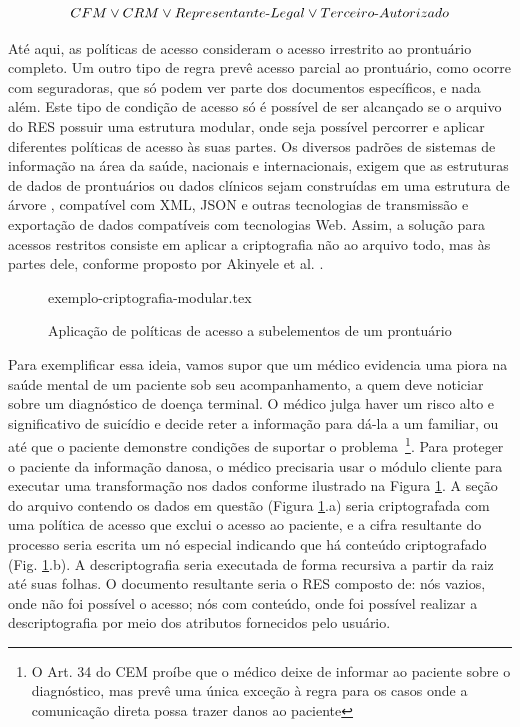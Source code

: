\documentclass[a4paper,11pt]{article}
\begin{document}
\[ CFM \vee CRM \vee Representante\textnormal{-}Legal \vee Terceiro\textnormal{-}Autorizado \]

Até aqui, as políticas de acesso consideram o acesso irrestrito ao prontuário completo. Um outro tipo de regra prevê acesso parcial ao prontuário, como ocorre com seguradoras, que só podem ver parte dos documentos específicos, e nada além.
Este tipo de condição de acesso só é possível de ser alcançado se o arquivo do RES possuir uma estrutura modular, onde seja possível percorrer e aplicar diferentes políticas de acesso às suas partes.
Os diversos padrões de sistemas de informação na área da saúde, nacionais e internacionais, exigem que as estruturas de dados de prontuários ou dados clínicos sejam construídas em uma estrutura de árvore \cite{Munoz2011, Dolin2000, SBIS2016, openEHRFoundation2020}, compatível com XML, JSON e outras tecnologias de transmissão e exportação de dados compatíveis com tecnologias Web.
Assim, a solução para acessos restritos consiste em aplicar a criptografia não ao arquivo todo, mas às partes dele, conforme proposto por Akinyele et al. \cite{Akinyele2010}.

\begin{figure}[h]
  \centering
  {exemplo-criptografia-modular.tex}
  \caption{Aplicação de políticas de acesso a subelementos de um prontuário}
  \label{fig:exemplo-criptografia-modular}
\end{figure}

Para exemplificar essa ideia, vamos supor que um médico evidencia uma piora na saúde mental de um paciente sob seu acompanhamento, a quem deve noticiar sobre um diagnóstico de doença terminal.
O médico julga haver um risco alto e significativo de suicídio e decide reter a informação para dá-la a um familiar, ou até que o paciente demonstre condições de suportar o problema~\footnote{O Art. 34 do CEM proíbe que o médico deixe de informar ao paciente sobre o diagnóstico, mas prevê uma única exceção à regra para os casos onde a comunicação direta possa trazer danos ao paciente}.
Para proteger o paciente da informação danosa, o médico precisaria usar o módulo cliente para executar uma transformação nos dados conforme ilustrado na Figura \ref{fig:exemplo-criptografia-modular}.
A seção do arquivo contendo os dados em questão (Figura \ref{fig:exemplo-criptografia-modular}.a) seria criptografada com uma política de acesso que exclui o acesso ao paciente, e a cifra resultante do processo seria escrita um nó especial indicando que há conteúdo criptografado (Fig. \ref{fig:exemplo-criptografia-modular}.b).
A descriptografia seria executada de forma recursiva a partir da raiz até suas folhas. O documento resultante seria o RES composto de: nós vazios, onde não foi possível o acesso; nós com conteúdo, onde foi possível realizar a descriptografia por meio dos atributos fornecidos pelo usuário.
\end{document}

